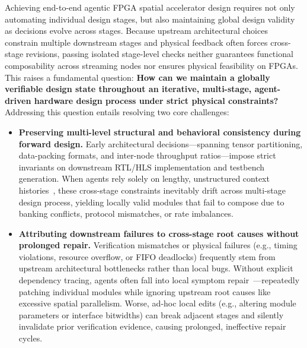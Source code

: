 \documentclass[conference]{IEEEtran}
\begin{document}
Achieving end-to-end agentic FPGA spatial accelerator design requires not only automating individual design stages, but also maintaining global design validity as decisions evolve across stages. Because upstream architectural choices constrain multiple downstream stages and physical feedback often forces cross-stage revisions, passing isolated stage-level checks neither guarantees functional composability across streaming nodes nor ensures physical feasibility on FPGAs. This raises a fundamental question: \textbf{How can we maintain a globally verifiable design state throughout an iterative, multi-stage, agent-driven hardware design process under strict physical constraints?} Addressing this question entails resolving two core challenges:
\begin{itemize}
\item \textbf{Preserving multi-level structural and behavioral consistency during forward design.} Early architectural decisions—spanning tensor partitioning, data-packing formats, and inter-node throughput ratios—impose strict invariants on downstream RTL/HLS implementation and testbench generation. When agents rely solely on lengthy, unstructured context histories~\cite{lostmiddle,longbench,locomo}, these cross-stage constraints inevitably drift across multi-stage design process, yielding locally valid modules that fail to compose due to banking conflicts, protocol mismatches, or rate imbalances.
\item \textbf{Attributing downstream failures to cross-stage root causes without prolonged repair.} Verification mismatches or physical failures (e.g., timing violations, resource overflow, or FIFO deadlocks) frequently stem from upstream architectural bottlenecks rather than local bugs. Without explicit dependency tracing, agents often fall into local symptom repair~\cite{swesearch}—repeatedly patching individual modules while ignoring upstream root causes like excessive spatial parallelism. Worse, ad-hoc local edits (e.g., altering module parameters or interface bitwidths) can break adjacent stages and silently invalidate prior verification evidence, causing prolonged, ineffective repair cycles.
\end{itemize}
\end{document}
